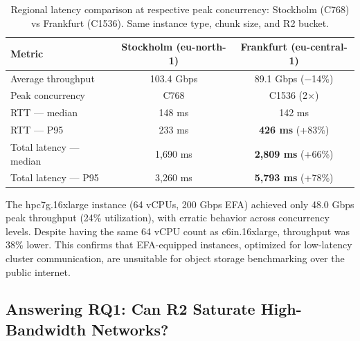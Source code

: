 \begin{table}[H]
\centering
\caption{Regional latency comparison at respective peak concurrency: Stockholm (C768) vs Frankfurt (C1536). Same instance type, chunk size, and R2 bucket.}
\label{tab:regional-latency}
\small
\begin{tabular}{lcc}
\hline
\textbf{Metric} & \textbf{Stockholm (eu-north-1)} & \textbf{Frankfurt (eu-central-1)} \\
\hline
Average throughput         & 103.4 Gbps  & 89.1 Gbps (−14\%)          \\
Peak concurrency           & C768        & C1536 (2×)                 \\
RTT --- median             & 148 ms      & 142 ms                     \\
RTT --- P95                & 233 ms      & \textbf{426 ms} (+83\%)    \\
Total latency --- median   & 1{,}690 ms  & \textbf{2{,}809 ms} (+66\%)\\
Total latency --- P95      & 3{,}260 ms  & \textbf{5{,}793 ms} (+78\%)\\
\hline
\end{tabular}
\end{table}

The hpc7g.16xlarge instance (64 vCPUs, 200 Gbps EFA) achieved only 48.0 Gbps peak throughput (24\% utilization), with erratic behavior across concurrency levels. Despite having the same 64 vCPU count as c6in.16xlarge, throughput was 38\% lower. This confirms that EFA-equipped instances, optimized for low-latency cluster communication, are unsuitable for object storage benchmarking over the public internet.

\subsection{Answering RQ1: Can R2 Saturate High-Bandwidth Networks?}

